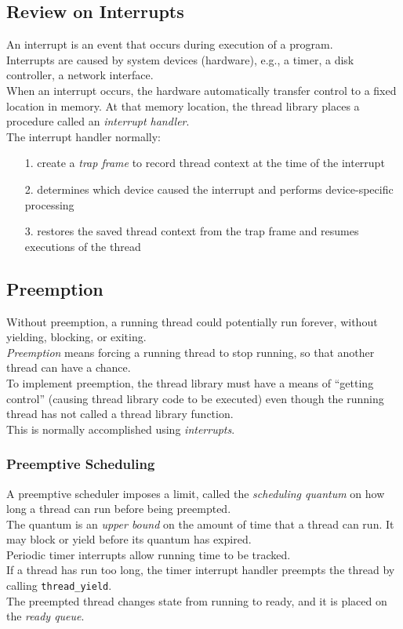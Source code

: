 \documentclass[12pt]{article}
\theoremstyle{plain}
\theoremstyle{definition}
\begin{document}
\subsection{Review on Interrupts}
An interrupt is an event that occurs during execution of a program. \\
Interrupts are caused by system devices (hardware), e.g., a timer, a disk controller, a network interface. \\
When an interrupt occurs, the hardware automatically transfer control to a fixed location in memory.
At that memory location, the thread library places a procedure called an \emph{interrupt handler}. \\
The interrupt handler normally:
\begin{enumerate}
  \item[1.] create a \emph{trap frame} to record thread context at the time of the interrupt
  \item[2.] determines which device caused the interrupt and performs device-specific processing
  \item[3.] restores the saved thread context from the trap frame and resumes executions of the thread
\end{enumerate}

\subsection{Preemption}
Without preemption, a running thread could potentially run forever, without yielding, blocking, or exiting. \\
\emph{Preemption} means forcing a running thread to stop running, so that another thread can have a chance. \\
To implement preemption, the thread library must have a means of ``getting control'' (causing thread library code to be executed) even though the running thread has not called a thread library function. \\
This is normally accomplished using \emph{interrupts}.

\subsubsection{Preemptive Scheduling}
A preemptive scheduler imposes a limit, called the \emph{scheduling quantum} on how long a thread can run before being preempted. \\
The quantum is an \emph{upper bound} on the amount of time that a thread can run.
It may block or yield before its quantum has expired. \\
Periodic timer interrupts allow running time to be tracked. \\
If a thread has run too long, the timer interrupt handler preempts the thread by calling \texttt{thread\_yield}. \\
The preempted thread changes state from running to ready, and it is placed on the \emph{ready queue}. \\
\end{document}
